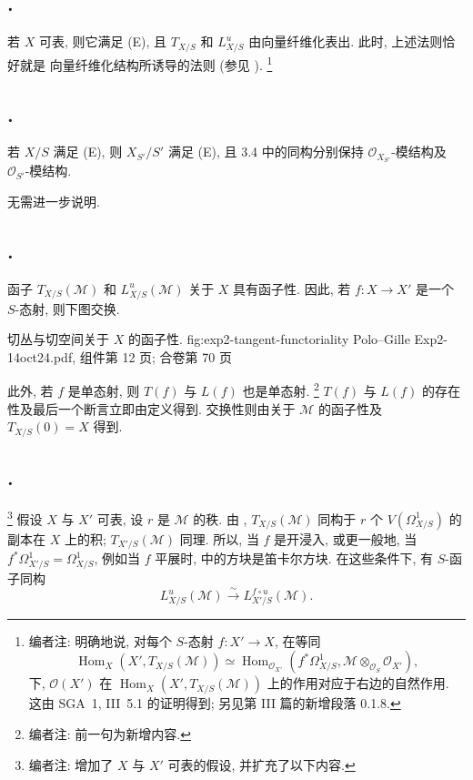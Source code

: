 \subsection*{.}
若 \(X\) 可表, 则它满足 (E), 且 \(T_{X/S}\) 和
\(L^u_{X/S}\) 由向量纤维化表出. 此时, 上述法则恰好就是
向量纤维化结构所诱导的法则 (参见 ).
\footnote{编者注: 明确地说, 对每个 \(S\)-态射
\(f:X'\to X\), 在等同
\[
  \operatorname{Hom}_X(X',T_{X/S}(\mathcal M))
  \simeq
  \operatorname{Hom}_{\mathcal O_{X'}}
    (f^*\Omega^1_{X/S},\mathcal M\otimes_{\mathcal O_S}\mathcal O_{X'}),
\]
下, \(\mathcal O(X')\) 在
\(\operatorname{Hom}_X(X',T_{X/S}(\mathcal M))\) 上的作用对应于右边的自然作用.
这由 SGA~1, III~5.1 的证明得到;
另见第 III 篇的新增段落 0.1.8.}

\subsection*{.}
若 \(X/S\) 满足 (E), 则 \(X_{S'}/S'\) 满足 (E),
且 3.4 中的同构分别保持 \(\mathcal O_{X_{S'}}\)-模结构及
\(\mathcal O_{S'}\)-模结构.

无需进一步说明.

\subsection*{.}
函子 \(T_{X/S}(\mathcal M)\) 和 \(L^u_{X/S}(\mathcal M)\)
关于 \(X\) 具有函子性. 因此, 若 \(f:X\to X'\) 是一个
\(S\)-态射, 则下图交换.

  {切丛与切空间关于 \(X\) 的函子性.}
  {fig:exp2-tangent-functoriality}
  {Polo--Gille Exp2-14oct24.pdf, 组件第 12 页; 合卷第 70 页}

此外, 若 \(f\) 是单态射, 则 \(T(f)\) 与 \(L(f)\) 也是单态射.
\footnote{编者注: 前一句为新增内容.}
\(T(f)\) 与 \(L(f)\) 的存在性及最后一个断言立即由定义得到.
交换性则由关于 \(\mathcal M\) 的函子性及 \(T_{X/S}(0)=X\) 得到.

\subsection*{.}
\footnote{编者注: 增加了 \(X\) 与 \(X'\) 可表的假设,
并扩充了以下内容.}
假设 \(X\) 与 \(X'\) 可表, 设 \(r\) 是 \(\mathcal M\) 的秩.
由 ,
\(T_{X/S}(\mathcal M)\) 同构于 \(r\) 个 \(V(\Omega^1_{X/S})\)
的副本在 \(X\) 上的积; \(T_{X'/S}(\mathcal M)\) 同理.
所以, 当 \(f\) 是开浸入, 或更一般地, 当
\(f^*\Omega^1_{X'/S}=\Omega^1_{X/S}\), 例如当 \(f\) 平展时,
 中的方块是笛卡尔方块.
在这些条件下, 有 \(S\)-函子同构
\[
  L^u_{X/S}(\mathcal M)
  \xrightarrow{\sim}L^{f\circ u}_{X'/S}(\mathcal M).
\]

